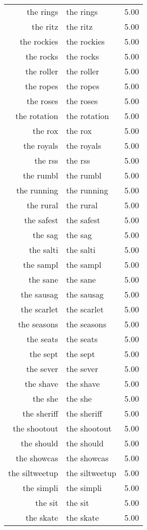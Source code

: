 \begin{table}[ht]
\begin{tabular}{rlr}
  the rings & the rings & 5.00 \\ 
  the ritz & the ritz & 5.00 \\ 
  the rockies & the rockies & 5.00 \\ 
  the rocks & the rocks & 5.00 \\ 
  the roller & the roller & 5.00 \\ 
  the ropes & the ropes & 5.00 \\ 
  the roses & the roses & 5.00 \\ 
  the rotation & the rotation & 5.00 \\ 
  the rox & the rox & 5.00 \\ 
  the royals & the royals & 5.00 \\ 
  the rss & the rss & 5.00 \\ 
  the rumbl & the rumbl & 5.00 \\ 
  the running & the running & 5.00 \\ 
  the rural & the rural & 5.00 \\ 
  the safest & the safest & 5.00 \\ 
  the sag & the sag & 5.00 \\ 
  the salti & the salti & 5.00 \\ 
  the sampl & the sampl & 5.00 \\ 
  the sane & the sane & 5.00 \\ 
  the sausag & the sausag & 5.00 \\ 
  the scarlet & the scarlet & 5.00 \\ 
  the seasons & the seasons & 5.00 \\ 
  the seats & the seats & 5.00 \\ 
  the sept & the sept & 5.00 \\ 
  the sever & the sever & 5.00 \\ 
  the shave & the shave & 5.00 \\ 
  the she & the she & 5.00 \\ 
  the sheriff & the sheriff & 5.00 \\ 
  the shootout & the shootout & 5.00 \\ 
  the should & the should & 5.00 \\ 
  the showcas & the showcas & 5.00 \\ 
  the siltweetup & the siltweetup & 5.00 \\ 
  the simpli & the simpli & 5.00 \\ 
  the sit & the sit & 5.00 \\ 
  the skate & the skate & 5.00 \\ 

\end{tabular}
\end{table}
